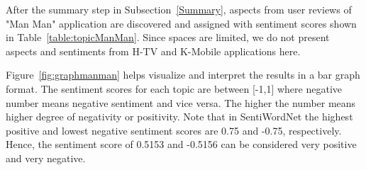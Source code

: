 After the summary step in Subsection~\ref{Summary}, aspects from user reviews of "Man Man" application are discovered and assigned with sentiment scores shown in Table~\ref{table:topicManMan}. Since spaces are limited, we do not present aspects and sentiments from H-TV and K-Mobile applications here.

Figure~\ref{fig:graphmanman} helps visualize and interpret the results in a bar graph format. The sentiment scores for each topic are between [-1,1] where negative number means negative sentiment and vice versa. The higher the number means higher degree of negativity or positivity. Note that in SentiWordNet the highest positive and lowest negative sentiment scores are 0.75 and -0.75, respectively. Hence, the sentiment score of 0.5153 and -0.5156 can be considered very positive and very negative. 

